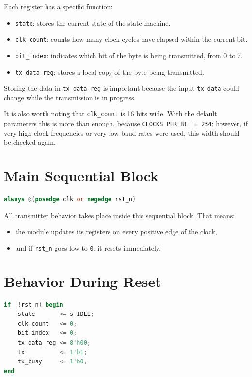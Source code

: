 \documentclass[12pt]{article}
\begin{document}
Each register has a specific function:

\begin{itemize}
    \item \texttt{state}: stores the current state of the state machine.
    \item \texttt{clk\_count}: counts how many clock cycles have elapsed within the current bit.
    \item \texttt{bit\_index}: indicates which bit of the byte is being transmitted, from 0 to 7.
    \item \texttt{tx\_data\_reg}: stores a local copy of the byte being transmitted.
\end{itemize}

Storing the data in \texttt{tx\_data\_reg} is important because the input \texttt{tx\_data} could change while the transmission is in progress.

It is also worth noting that \texttt{clk\_count} is 16 bits wide. With the default parameters this is more than enough, because \texttt{CLOCKS\_PER\_BIT = 234}; however, if very high clock frequencies or very low baud rates were used, this width should be checked again.

\section{Main Sequential Block}

\begin{lstlisting}[language=Verilog]
always @(posedge clk or negedge rst_n)
\end{lstlisting}

All transmitter behavior takes place inside this sequential block. That means:

\begin{itemize}
    \item the module updates its registers on every positive edge of the clock,
    \item and if \texttt{rst\_n} goes low to \texttt{0}, it resets immediately.
\end{itemize}

\section{Behavior During Reset}

\begin{lstlisting}[language=Verilog]
if (!rst_n) begin
    state       <= s_IDLE;
    clk_count   <= 0;
    bit_index   <= 0;
    tx_data_reg <= 8'h00;
    tx          <= 1'b1;
    tx_busy     <= 1'b0;
end
\end{lstlisting}
\end{document}
